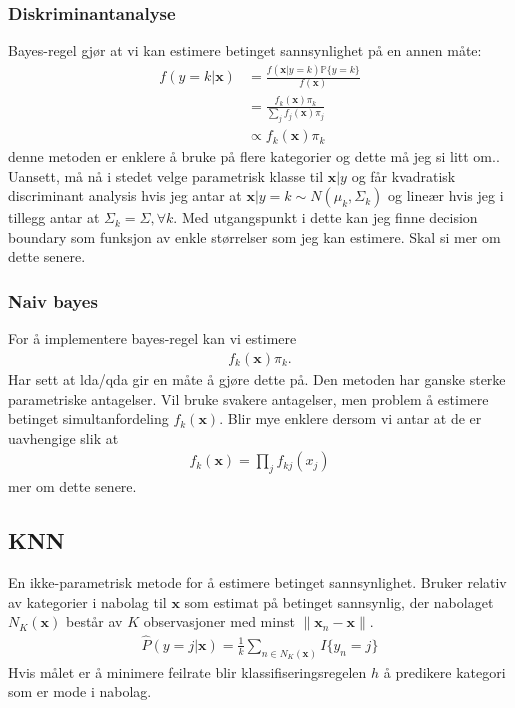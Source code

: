 \subsubsection{Diskriminantanalyse}
Bayes-regel gjør at vi kan estimere betinget sannsynlighet på en annen måte:
\begin{align}
f(y=k|\mathbf{x}) &= \frac{f(\mathbf{x}|y=k)\mathbb{P}\{y=k\}}{f(\mathbf{x})} \\
&= \frac{f_k(\mathbf{x})\pi_k}{\sum_j f_j(\mathbf{x})\pi_j} \\
& \propto f_k(\mathbf{x})\pi_k
\end{align}
denne metoden er enklere å bruke på flere kategorier og dette må jeg si litt om.. Uansett, må nå i stedet velge parametrisk klasse til $\mathbf{x}|y$ og får kvadratisk discriminant analysis hvis jeg antar at $\mathbf{x}|y=k \sim N(\mu_k,\Sigma_k)$ og lineær hvis jeg i tillegg antar at $\Sigma_k=\Sigma, \forall k$. Med utgangspunkt i dette kan jeg finne decision boundary som funksjon av enkle størrelser som jeg kan estimere. Skal si mer om dette senere.
\subsubsection{Naiv bayes}
For å implementere bayes-regel kan vi estimere
\begin{align}
f_k(\mathbf{x})\pi_k.
\end{align}
Har sett at lda/qda gir en måte å gjøre dette på. Den metoden har ganske sterke parametriske antagelser. Vil bruke svakere antagelser, men problem å estimere betinget simultanfordeling $f_k(\mathbf{x})$. Blir mye enklere dersom vi antar at de er uavhengige slik at 
\begin{align}
f_k(\mathbf{x}) = \prod_j f_{kj}(x_j)
\end{align}
mer om dette senere.
\subsection{KNN}
En ikke-parametrisk metode for å estimere betinget sannsynlighet. Bruker relativ av kategorier i nabolag til $\mathbf{x}$ som estimat på betinget sannsynlig, der nabolaget $N_K(\mathbf{x})$ består av $K$ observasjoner med minst $\lVert \mathbf{x}_n - \mathbf{x} \rVert$.
\begin{align}
\hat{P}(y=j|\mathbf{x}) = \frac{1}{k}\sum_{n\in N_K(\mathbf{x})} I\{y_n = j\}
\end{align}
Hvis målet er å minimere feilrate blir klassifiseringsregelen $h$ å predikere kategori som er mode i nabolag. 
